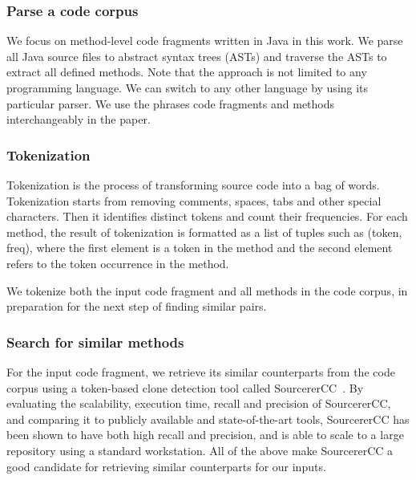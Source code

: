 \subsubsection{Parse a code corpus}
We focus on method-level code fragments written in Java in this work. We parse all Java source files to abstract syntax trees (ASTs) and traverse the ASTs to extract all defined methods. Note that the approach is not limited to any programming language. We can switch to any other language by using its particular parser. We use the phrases code fragments and methods interchangeably in the paper.

\subsubsection{Tokenization}
Tokenization is the process of transforming source code into a bag of words. Tokenization starts from removing comments, spaces, tabs and other special characters. Then it identifies distinct tokens and count their frequencies. For each method, the result of tokenization is formatted as a list of tuples such as {\ttt (token, freq)}, where the first element is a token in the method and the second element refers to the token occurrence in the method.

We tokenize both the input code fragment and all methods in the code corpus, in preparation for the next step of finding similar pairs.

\subsubsection{Search for similar methods}
For the input code fragment, we retrieve its similar counterparts from the code corpus using a token-based clone detection tool called SourcererCC~\cite{sajnani2016sourcerercc}. By evaluating the scalability, execution time, recall and precision of SourcererCC, and comparing it to publicly available and state-of-the-art tools, SourcererCC has been shown to have both high recall and precision, and is able to scale to a large repository using a standard workstation. All of the above make SourcererCC a good candidate for retrieving similar counterparts for our inputs. 

